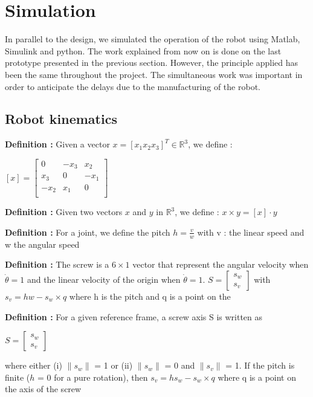 \section{Simulation}

\hspace{\parindent} In parallel to the design, we simulated the operation of the robot using Matlab, Simulink and python. The work explained from now on is done on the last prototype presented in the previous section. However, the principle applied has been the same throughout the project. The simultaneous work was important in order to anticipate the delays due to the manufacturing of the robot. 

\subsection{Robot kinematics}

\textbf{Definition :} Given a vector $x=[x_1 x_2 x_3]^T \in \mathbb{R}^3$, we define : 
\begin{center}
    $[x] = \begin{bmatrix}
        0 & -x_3 & x_2 \\
        x_3 & 0 & -x_1 \\
        -x_2 & x_1 & 0 \\
    \end{bmatrix}$
\end{center}

\noindent\textbf{Definition :} Given two vectors $x$ and $y$ in $\mathbb{R}^3$, we define : $x\times y = [x]\cdot y$

\bigbreak

\noindent\textbf{Definition :} For a joint, we define the pitch $h = \frac{v}{w}$ with v : the linear speed and w the angular speed

\bigbreak

\noindent\textbf{Definition :} The screw is a $6\times1$ vector that represent the angular velocity when $\dot{\theta}=1$ and the linear velocity of the origin when $\dot{\theta}=1$. $S = \begin{bmatrix} s_w\\s_v\end{bmatrix}$ with $s_v = hw-s_w\times q$ where h is the pitch and q is a point on the 

\noindent\textbf{Definition :} For a given reference frame, a screw axis S is written as 
\begin{center}
    $S=\begin{bmatrix}
        s_w\\s_v
    \end{bmatrix}$
\end{center}
where either (i) $\|s_w\|$ = 1 or (ii) $\|s_w\|$ = 0 and $\|s_v\|$ = 1. If the pitch is finite ($h$ = 0 for a pure rotation), then $s_v = hs_w-s_w\times q$ where q is a point on the axis of the screw

